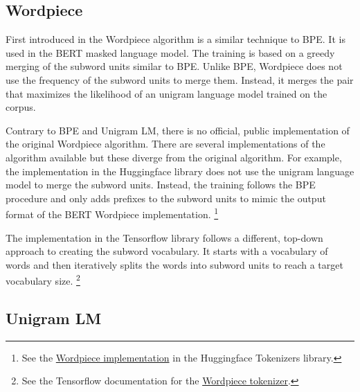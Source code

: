 

\subsection{Wordpiece}

First introduced in \cite{schuster_japanese_2012} the Wordpiece algorithm is a similar technique to BPE. It is used in the BERT \citep{devlin_bert_2019} masked language model. The training is based on a greedy merging of the subword units similar to BPE. Unlike BPE, Wordpiece does not use the frequency of the subword units to merge them. Instead, it merges the pair that maximizes the likelihood of an unigram language model trained on the corpus.

Contrary to BPE and Unigram LM, there is no official, public implementation of the original Wordpiece algorithm. There are several implementations of the algorithm available but these diverge from the original algorithm. For example, the implementation in the Huggingface library \citep{wolf_transformers_2020} does not use the unigram language model to merge the subword units. Instead, the training follows the BPE procedure and only adds prefixes to the subword units to mimic the output format of the BERT Wordpiece implementation. \footnote{See the \href{https://github.com/huggingface/tokenizers/blob/291b2e23ae81cf94738835852213ce120152d121/tokenizers/src/models/wordpiece/trainer.rs}{Wordpiece implementation} in the Huggingface Tokenizers library.}


The implementation in the Tensorflow library follows a different, top-down approach to creating the subword vocabulary. It starts with a vocabulary of words and then iteratively splits the words into subword units to reach a target vocabulary size. \footnote{See the Tensorflow documentation for the \href{https://www.tensorflow.org/text/api_docs/python/text/WordpieceTokenizer}{Wordpiece tokenizer}.}

% 

\subsection{Unigram LM}
\label{sec:unigram}

